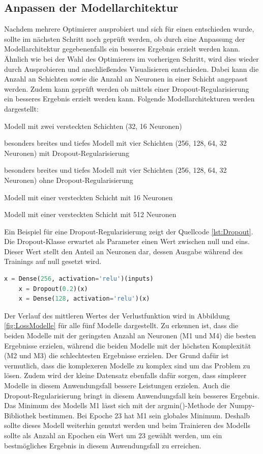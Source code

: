 \subsection{Anpassen der Modellarchitektur}
Nachdem mehrere Optimierer ausprobiert und sich für einen entschieden wurde, sollte im nächsten Schritt noch geprüft werden, ob durch eine Anpassung der Modellarchitektur
gegebenenfalls ein besseres Ergebnis erzielt werden kann. Ähnlich wie bei der Wahl des Optimierers im vorherigen Schritt, wird dies wieder durch Ausprobieren und 
anschließendes Visualisieren entschieden. Dabei kann die Anzahl an Schichten sowie die Anzahl an Neuronen in einer Schicht angepasst werden.
Zudem kann geprüft werden ob mittels einer Dropout-Regularisierung ein besseres Ergebnis erzielt werden kann. 
Folgende Modellarchitekturen werden dargestellt:
\begin{description}[style=multiline,leftmargin=3cm,font=\bfseries, nolistsep]
    \item[M1] Modell mit zwei versteckten Schichten (32, 16 Neuronen)
    \item[M2] besonders breites und tiefes Modell mit vier Schichten (256, 128, 64, 32 Neuronen) mit Dropout-Regularisierung
    \item[M3] besonders breites und tiefes Modell mit vier Schichten (256, 128, 64, 32 Neuronen) ohne Dropout-Regularisierung
    \item[M4] Modell mit einer versteckten Schicht mit 16 Neuronen
    \item[M5] Modell mit einer versteckten Schicht mit 512 Neuronen
\end{description}
Ein Beispiel für eine Dropout-Regularisierung zeigt der Quellcode \ref*{lst:Dropout}. Die Dropout-Klasse erwartet als Parameter einen Wert zwischen null und eins. 
Dieser Wert stellt den Anteil an Neuronen dar, dessen Ausgabe während des Trainings auf null gesetzt wird.
\begin{lstlisting}[language = python, caption={Dropout-Regularisierung mit Keras},captionpos=b, label = lst:Dropout, floatplacement=H]
    x = Dense(256, activation='relu')(inputs)
    x = Dropout(0.2)(x)
    x = Dense(128, activation='relu')(x)
\end{lstlisting}
Der Verlauf des mittleren Wertes der Verlustfunktion wird in Abbildung \ref*{fig:LossModelle} für alle fünf Modelle dargestellt. Zu erkennen ist, dass die beiden Modelle mit 
der geringsten Anzahl an Neuronen (M1 und M4) die besten Ergebnisse erzielen, während die beiden Modelle mit der höchsten Komplexität (M2 und M3) die schlechtesten Ergebnisse
erzielen. Der Grund dafür ist vermutlich, dass die komplexeren Modelle zu komplex sind um das Problem zu lösen. Zudem wird der kleine Datensatz ebenfalls dafür sorgen,
dass simplerer Modelle in diesem Anwendungsfall bessere Leistungen erzielen. Auch die Dropout-Regularisierung bringt in diesem Anwendungsfall kein besseres Ergebnis. Das Minimum
des Modells M1 lässt sich mit der argmin()-Methode der Numpy-Bibliothek bestimmen. Bei Epoche 23 hat M1 sein globales Minimum. Deshalb sollte dieses Modell weiterhin genutzt werden
und beim Trainieren des Modells sollte als Anzahl an Epochen ein Wert um 23 gewählt werden, um ein bestmögliches Ergebnis in diesem Anwendungsfall zu erreichen.

